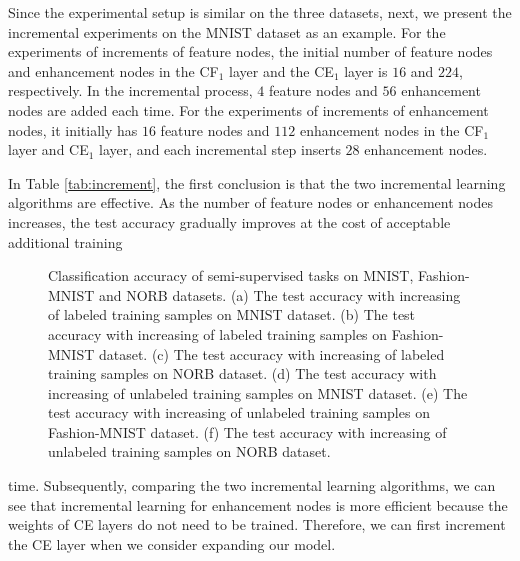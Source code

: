 \documentclass[lettersize,journal]{IEEEtran}
\begin{document}
Since the experimental setup is similar on the three datasets, next, we present the incremental experiments on the MNIST dataset as an example. For the experiments of increments of feature nodes, the initial number of feature nodes and enhancement nodes in the CF$_1$ layer and the CE$_1$ layer is $16$ and $224$, respectively. In the incremental process, $4$ feature nodes and $56$ enhancement nodes are added each time. For the experiments of increments of enhancement nodes, it initially has $16$ feature nodes and $112$ enhancement nodes in the CF$_1$ layer and CE$_1$ layer, and each incremental step inserts $28$ enhancement nodes.

In Table \ref{tab:increment}, the first conclusion is that the two incremental learning algorithms are effective. As the number of feature nodes or enhancement nodes increases, the test accuracy gradually improves at the cost of acceptable additional training
\begin{figure*}[!t]
    \centering
    \hfil
    \hfil
    \newline
    \hfil
    \hfil
    \newline
    \caption{Classification accuracy of semi-supervised tasks on MNIST, Fashion-MNIST and NORB datasets. (a) The test accuracy with increasing of labeled training samples on MNIST dataset. (b) The test accuracy with increasing of labeled training samples on Fashion-MNIST dataset. (c) The test accuracy with increasing of labeled training samples on NORB dataset. (d) The test accuracy with increasing of unlabeled training samples on MNIST dataset. (e) The test accuracy with increasing of unlabeled training samples on Fashion-MNIST dataset. (f) The test accuracy with increasing of unlabeled training samples on NORB dataset.}
    \label{fig:semi-supervised}
\end{figure*}
time. Subsequently, comparing the two incremental learning algorithms, we can see that incremental learning for enhancement nodes is more efficient because the weights of CE layers do not need to be trained. Therefore, we can first increment the CE layer when we consider expanding our model.
\end{document}
